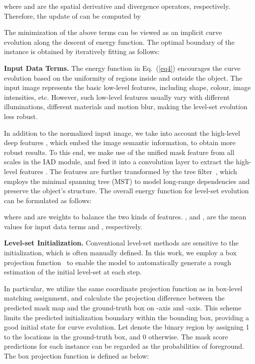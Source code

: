 \documentclass[12pt,onecolumn,letterpaper]{article}
\begin{document}
where  and  are the spatial derivative and  divergence operators, respectively. Therefore, the update of  can be computed by


The minimization of the above terms can be viewed as an implicit curve evolution along the descent of energy function. The optimal boundary  of the instance is obtained by iteratively fitting  as follows:


\textbf{Input Data Terms.} The energy function in Eq.~(\ref{eq4}) encourages the curve evolution based on the uniformity of regions inside and outside the object. The input image  represents the basic low-level features, including shape, colour, image intensities, etc. However, such low-level features usually vary with different illuminations, different materials and motion blur, making the level-set evolution less robust.

In addition to the normalized input image, we take into account the high-level deep features , which embed the image semantic information, to obtain more robust results. To this end, we make use of the unified mask feature  from all scales in the IAD module, and feed it into a convolution layer to extract the high-level features . 
The features  are further transformed by the tree filter~\cite{nips2019learnable, liang2022tree}, which employs the minimal spanning tree (MST) to model long-range dependencies and preserve the object's structure. 
The overall energy function for level-set evolution can be formulated as follows:

where  and  are weights to balance the two kinds of features. ,  and ,  are the mean values for input data terms  and , respectively.

\textbf{Level-set Initialization.} Conventional level-set methods are sensitive to the initialization, which is often manually defined. In this work, we employ a box projection function~\cite{cvpr2021_boxinst} to enable the model to automatically generate a rough estimation of the initial level-set  at each step.

In particular, we utilize the same coordinate projection function  as in box-level matching assignment, and calculate the projection difference between the predicted mask map and the ground-truth box on -axis and -axis. 
This scheme limits the predicted initialization boundary within the bounding box, providing a good initial state for curve evolution. 
Let  denote the binary region by assigning 1 to the locations in the ground-truth box, and 0 otherwise. The mask score predictions  for each instance can be regarded as the probabilities of foreground. The box projection function  is defined as below:
\end{document}
